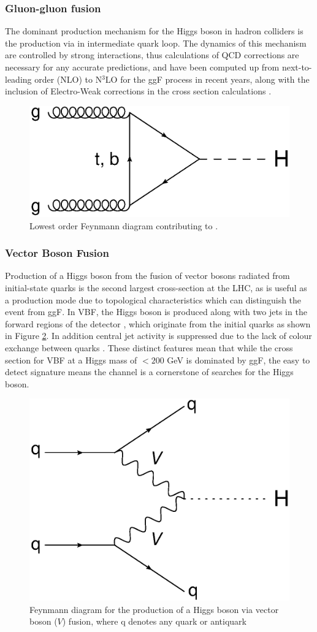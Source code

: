 		\subsubsection{Gluon-gluon fusion}
		
		The dominant production mechanism for the Higgs boson in hadron colliders is the \ggF production via in intermediate quark loop. The dynamics of this mechanism are controlled by strong interactions, thus calculations of QCD corrections are necessary for any accurate predictions, and have been computed up from next-to-leading order (NLO) to N$^3$LO for the ggF process in recent years, along with the inclusion of Electro-Weak corrections in the cross section calculations \cite{LHCHiggsCS}. 
		
			\begin{figure}[h]
			\centering
			\includegraphics[width=0.4\linewidth]{T/FIGS/ggF}
			\caption{Lowest order Feynmann diagram contributing to \ggF.}
			\label{fig:ggf}
			\end{figure}
			
		\subsubsection{Vector Boson Fusion}
		
			Production of a Higgs boson from the fusion of vector bosons radiated from initial-state quarks is the second largest cross-section at the LHC, as is useful as a production mode due to topological characteristics which can distinguish the event from ggF. In VBF, the Higgs boson is produced along with two jets in the forward regions of the detector , which originate from the initial quarks as shown in Figure \ref{fig:vbf}. In addition central jet activity is suppressed due to the lack of colour exchange between quarks \cite{VBF2004}.  These distinct features mean that while the cross section for VBF at a Higgs mass of $< 200$ GeV is dominated by ggF, the easy to detect signature means the channel is a cornerstone of searches for the Higgs boson.
		
					\begin{figure}[h]
						\centering
						\includegraphics[width=0.4\linewidth]{T/FIGS/vbf}
						\caption{Feynmann diagram for the production of a Higgs boson via vector boson ($V$) fusion, where q denotes any quark or antiquark}
						\label{fig:vbf}
					\end{figure}
						
